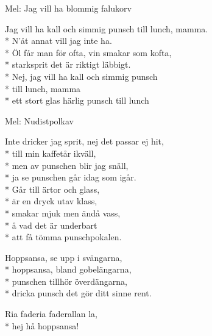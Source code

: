 \begin{SongText}
    \begin{SongInfo}
        Mel: Jag vill ha blommig falukorv
    \end{SongInfo}
    \begin{SongVerse}
        Jag vill ha kall och simmig punsch till lunch, mamma.\\*%
        N'åt annat vill jag inte ha.\\*%
        Öl får man för ofta, vin smakar som kofta,\\*%
        starksprit det är riktigt läbbigt.\\*%
        Nej, jag vill ha kall och simmig punsch\\*%
        till lunch, mamma\\*%
        ett stort glas härlig punsch till lunch
    \end{SongVerse}\end{SongText}
\begin{SongText}[Punschpolkett]
    \begin{SongInfo}
        Mel: Nudistpolkav
    \end{SongInfo}
    \begin{SongVerse}
        Inte dricker jag sprit, nej det passar ej hit,\\*%
        till min kaffetår ikväll,\\*%
        men av punschen blir jag snäll,\\*%
        ja se punschen går idag som igår.\\*%
        Går till ärtor och glass,\\*%
        är en dryck utav klass,\\*%
        smakar mjuk men ändå vass,\\*%
        å vad det är underbart\\*%
        att få tömma punschpokalen.
    \end{SongVerse}
    \begin{SongVerse}
        Hoppsansa, se upp i svängarna,\\*%
        hoppsansa, bland gobelängarna,\\*%
        punschen tillhör överdängarna,\\*%
        dricka punsch det gör ditt sinne rent.
    \end{SongVerse}
    \begin{SongVerse}
        Ria faderia faderallan la,\\*%
        hej hå hoppsansa!
    \end{SongVerse}\end{SongText}
